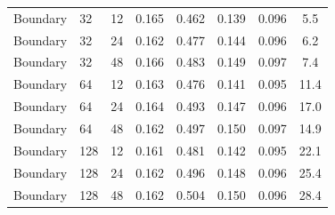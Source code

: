 \documentclass[referee]{gji}
\begin{document}
\begin{longtable}{@{}llcccccc@{}}
Boundary & 32 & 12 & 0.165 & 0.462 & 0.139 & 0.096 & 5.5 \\
Boundary & 32 & 24 & 0.162 & 0.477 & 0.144 & 0.096 & 6.2 \\
Boundary & 32 & 48 & 0.166 & 0.483 & 0.149 & 0.097 & 7.4 \\
Boundary & 64 & 12 & 0.163 & 0.476 & 0.141 & 0.095 & 11.4 \\
Boundary & 64 & 24 & 0.164 & 0.493 & 0.147 & 0.096 & 17.0 \\
Boundary & 64 & 48 & 0.162 & 0.497 & 0.150 & 0.097 & 14.9 \\
Boundary & 128 & 12 & 0.161 & 0.481 & 0.142 & 0.095 & 22.1 \\
Boundary & 128 & 24 & 0.162 & 0.496 & 0.148 & 0.096 & 25.4 \\
Boundary & 128 & 48 & 0.162 & 0.504 & 0.150 & 0.096 & 28.4 \\
\end{longtable}
\normalsize

\label{lastpage}
\end{document}
